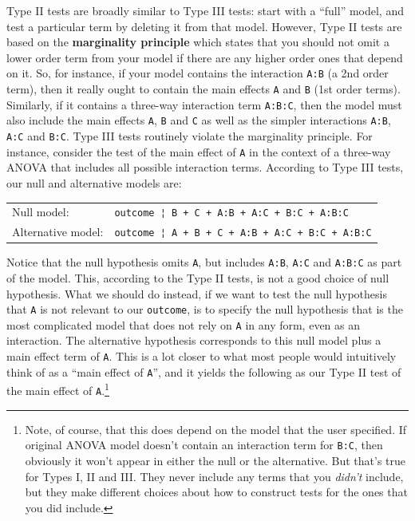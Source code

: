 \documentclass[
  11pt,
  a4paper,
  twoside,symmetric,openright]{book}
\theoremstyle{break}
\theoremstyle{break}
\begin{document}
Type II tests are broadly similar to Type III tests: start with a ``full'' model, and test a particular term by deleting it from that model. However, Type II tests are based on the \textbf{marginality principle} which states that you should not omit a lower order term from your model if there are any higher order ones that depend on it. So, for instance, if your model contains the interaction \texttt{A:B} (a 2nd order term), then it really ought to contain the main effects \texttt{A} and \texttt{B} (1st order terms). Similarly, if it contains a three-way interaction term \texttt{A:B:C}, then the model must also include the main effects \texttt{A}, \texttt{B} and \texttt{C} as well as the simpler interactions \texttt{A:B}, \texttt{A:C} and \texttt{B:C}. Type III tests routinely violate the marginality principle. For instance, consider the test of the main effect of \texttt{A} in the context of a three-way ANOVA that includes all possible interaction terms. According to Type III tests, our null and alternative models are:

\begin{longtable}[]{@{}ll@{}}
\toprule\noalign{}
\endhead
\bottomrule\noalign{}
\endlastfoot
Null model: & \texttt{outcome\ ¦\ B\ +\ C\ +\ A:B\ +\ A:C\ +\ B:C\ +\ A:B:C} \\
Alternative model: & \texttt{outcome\ ¦\ A\ +\ B\ +\ C\ +\ A:B\ +\ A:C\ +\ B:C\ +\ A:B:C} \\
\end{longtable}

Notice that the null hypothesis omits \texttt{A}, but includes \texttt{A:B}, \texttt{A:C} and \texttt{A:B:C} as part of the model. This, according to the Type II tests, is not a good choice of null hypothesis. What we should do instead, if we want to test the null hypothesis that \texttt{A} is not relevant to our \texttt{outcome}, is to specify the null hypothesis that is the most complicated model that does not rely on \texttt{A} in any form, even as an interaction. The alternative hypothesis corresponds to this null model plus a main effect term of \texttt{A}. This is a lot closer to what most people would intuitively think of as a ``main effect of \texttt{A}'', and it yields the following as our Type II test of the main effect of \texttt{A}.\footnote{Note, of course, that this does depend on the model that the user specified. If original ANOVA model doesn't contain an interaction term for \texttt{B:C}, then obviously it won't appear in either the null or the alternative. But that's true for Types I, II and III. They never include any terms that you \emph{didn't} include, but they make different choices about how to construct tests for the ones that you did include.}
\end{document}
